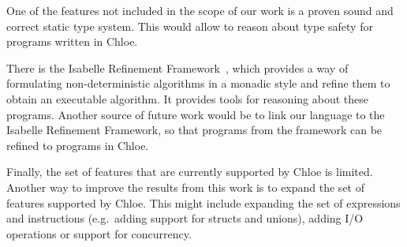 One of the features not included in the scope of our work is a proven sound and correct static type system.
This would allow to reason about type safety for programs written in Chloe.

There is the Isabelle Refinement Framework~\parencite{Refine_Monadic-AFP}, which provides a way of formulating non-deterministic algorithms in a monadic style and refine them to obtain an executable algorithm.
It provides tools for reasoning about these programs.
Another source of future work would be to link our language to the Isabelle Refinement Framework, so that programs from the framework can be refined to programs in Chloe.

Finally, the set of features that are currently supported by Chloe is limited.
Another way to improve the results from this work is to expand the set of features supported by Chloe.
This might include expanding the set of expressions and instructions (e.g.\ adding support for structs and unions), adding I/O operations or support for concurrency.
